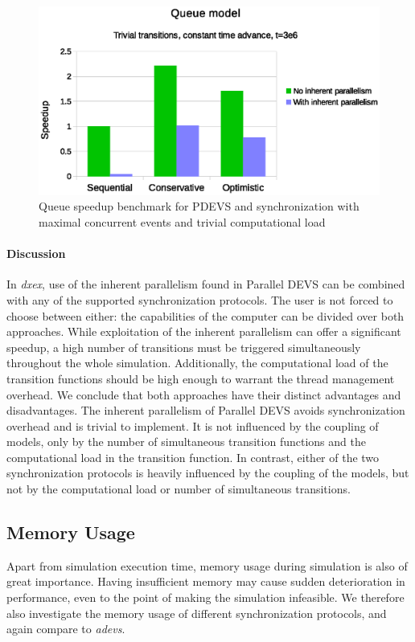 \begin{figure}
	\center
	\includegraphics[width=\columnwidth]{fig/pdevs_no_sleep.eps}
	\caption{Queue speedup benchmark for PDEVS and synchronization with maximal concurrent events and trivial computational load}
	\label{fig:pdevs_plot_no_sleep}
\end{figure}

\paragraph{Discussion}
In \textit{dxex}, use of the inherent parallelism found in \textsf{Parallel DEVS} can be combined with any of the supported synchronization protocols.
The user is not forced to choose between either: the capabilities of the computer can be divided over both approaches.
While exploitation of the inherent parallelism can offer a significant speedup, a high number of transitions must be triggered simultaneously throughout the whole simulation.
Additionally, the computational load of the transition functions should be high enough to warrant the thread management overhead.
We conclude that both approaches have their distinct advantages and disadvantages.
The inherent parallelism of \textsf{Parallel DEVS} avoids synchronization overhead and is trivial to implement.
It is not influenced by the coupling of models, only by the number of simultaneous transition functions and the computational load in the transition function.
In contrast, either of the two synchronization protocols is heavily influenced by the coupling of the models, but not by the computational load or number of simultaneous transitions.

\subsection{Memory Usage}
Apart from simulation execution time, memory usage during simulation is also of great importance. Having insufficient memory may cause sudden deterioration in performance, even to the point of making the simulation infeasible.
We therefore also investigate the memory usage of different synchronization protocols, and again compare to \textit{adevs}.

